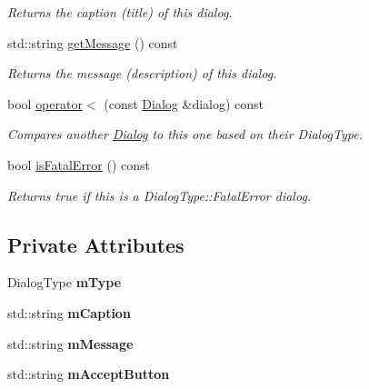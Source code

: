 \begin{DoxyCompactItemize}
\begin{DoxyCompactList}\small\item\em Returns the caption (title) of this dialog. \end{DoxyCompactList}\item 
\mbox{\label{classpepr3d_1_1_dialog_ae355e45bb6a9d50ddaa2e83b16ae45e2}} 
std\+::string \mbox{\hyperlink{classpepr3d_1_1_dialog_ae355e45bb6a9d50ddaa2e83b16ae45e2}{get\+Message}} () const
\begin{DoxyCompactList}\small\item\em Returns the message (description) of this dialog. \end{DoxyCompactList}\item 
\mbox{\label{classpepr3d_1_1_dialog_a5d81c6ce2dad14e34ebdb553e84023b4}} 
bool \mbox{\hyperlink{classpepr3d_1_1_dialog_a5d81c6ce2dad14e34ebdb553e84023b4}{operator$<$}} (const \mbox{\hyperlink{classpepr3d_1_1_dialog}{Dialog}} \&dialog) const
\begin{DoxyCompactList}\small\item\em Compares another \mbox{\hyperlink{classpepr3d_1_1_dialog}{Dialog}} to this one based on their Dialog\+Type. \end{DoxyCompactList}\item 
\mbox{\label{classpepr3d_1_1_dialog_a6e8161d42cbe0d944c17a3654c488b9a}} 
bool \mbox{\hyperlink{classpepr3d_1_1_dialog_a6e8161d42cbe0d944c17a3654c488b9a}{is\+Fatal\+Error}} () const
\begin{DoxyCompactList}\small\item\em Returns true if this is a Dialog\+Type\+::\+Fatal\+Error dialog. \end{DoxyCompactList}\end{DoxyCompactItemize}
\subsection*{Private Attributes}
\begin{DoxyCompactItemize}
\item 
\mbox{\label{classpepr3d_1_1_dialog_a8dac2f03ef5c80024135b71b7ff183b2}} 
Dialog\+Type {\bfseries m\+Type}
\item 
\mbox{\label{classpepr3d_1_1_dialog_afd033d0e47cb9566bf2e066c2c316653}} 
std\+::string {\bfseries m\+Caption}
\item 
\mbox{\label{classpepr3d_1_1_dialog_a13c34841e99aac2877842585ecd49451}} 
std\+::string {\bfseries m\+Message}
\item 
\mbox{\label{classpepr3d_1_1_dialog_a3676a0eaba149cbd1a5b611ca10360e3}} 
std\+::string {\bfseries m\+Accept\+Button}
\end{DoxyCompactItemize}


